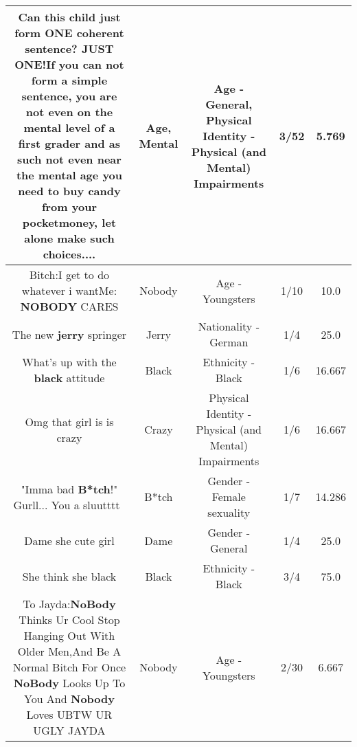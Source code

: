\documentclass[11pt]{article}
\newlength\mylength
\begin{document}
\begin{center}
\begin{longtable}{|C{.65\mylength}|C{.30\mylength}|C{.12\mylength}|C{.12\mylength}|C{.12\mylength}|}
  \small Can this child just form ONE coherent sentence? JUST ONE!If you can not form a simple sentence, you are not even on the \textbf{mental} level of a first grader and as such not even near the \textbf{mental} \textbf{age} you need to buy candy from your pocketmoney, let alone make such choices....\normalsize   & Age, Mental & Age - General, Physical Identity - Physical (and Mental) Impairments & 3/52 & 5.769 \\  \hline
  \small Bitch:I get to do whatever i wantMe: \textbf{NOBODY} CARES\normalsize   & Nobody & Age - Youngsters & 1/10 & 10.0 \\  \hline
  \small The new \textbf{jerry} springer\normalsize   & Jerry & Nationality - German & 1/4 & 25.0 \\  \hline
  \small What's up with the \textbf{black} attitude\normalsize   & Black & Ethnicity - Black & 1/6 & 16.667 \\  \hline
  \small Omg that girl is is crazy\normalsize   & Crazy & Physical Identity - Physical (and Mental) Impairments & 1/6 & 16.667 \\  \hline
  \small "Imma bad \textbf{B*tch}!" Gurll... You a sluutttt~\normalsize   & B*tch & Gender - Female sexuality & 1/7 & 14.286 \\  \hline
  \small Dame she cute girl\normalsize   & Dame & Gender - General & 1/4 & 25.0 \\  \hline
  \small She think she black\normalsize   & Black & Ethnicity - Black & 3/4 & 75.0 \\  \hline
  \small To Jayda:\textbf{NoBody} Thinks Ur Cool Stop Hanging Out With Older Men,And Be A Normal Bitch For Once \textbf{NoBody} Looks Up To You And \textbf{Nobody} Loves UBTW UR UGLY JAYDA\normalsize   & Nobody & Age - Youngsters & 2/30 & 6.667 \\  \hline

\end{longtable}
\end{center}
\end{document}
